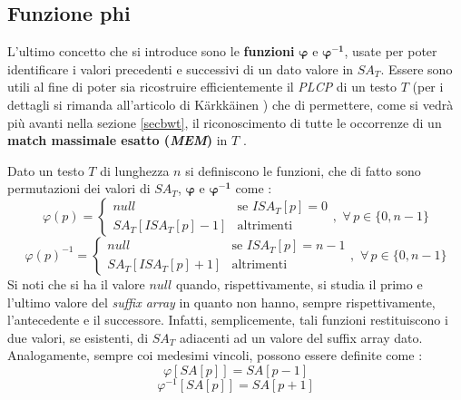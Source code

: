 \subsection{Funzione phi}
L'ultimo concetto che si introduce sono le \textbf{funzioni}
$\boldsymbol\varphi$ e $\mathbf{\boldsymbol\varphi^{-1}}$, usate per poter
identificare i valori precedenti e successivi di 
un dato valore in $SA_T$. Essere sono utili al fine di poter sia ricostruire
efficientemente il \textit{PLCP} di un testo $T$ (per i dettagli si rimanda
all'articolo di K\"{a}rkk\"{a}inen \cite{plcp}) che di permettere, come si vedrà
più  avanti nella sezione \ref{secbwt}, il riconoscimento di tutte le occorrenze
di un \textbf{match massimale esatto (\textit{MEM})} in $T$ \cite{phoni}.
\begin{definizione}
  Dato un testo $T$ di lunghezza $n$ si definiscono le funzioni, che di fatto
  sono permutazioni dei valori di $SA_T$, $\boldsymbol\varphi$ e
  $\mathbf{\boldsymbol\varphi^{-1}}$ come \cite{phoni}: 
  \begin{equation}
    \label{eq:phidef1}
    \varphi(p)=
    \begin{cases}
      null&\mbox{se } ISA_T[p]=0\\
      SA_T[ISA_T[p]-1]&\mbox{altrimenti}
    \end{cases},\,\,\forall\, p\in\{0,n-1\}
  \end{equation}
  \begin{equation}
    \label{eq:phiinvdef1}
    \varphi(p)^{-1}=
    \begin{cases}
      null&\mbox{se } ISA_T[p]=n-1\\
      SA_T[ISA_T[p]+1]&\mbox{altrimenti}
    \end{cases},\,\,\forall\, p\in\{0,n-1\}
  \end{equation}
  Si noti che si ha il valore $null$ quando, rispettivamente, si studia il
  primo e l'ultimo valore del \textit{suffix array} in quanto non hanno, sempre
  rispettivamente, l'antecedente e il successore.   Infatti, semplicemente, tali
  funzioni restituiscono i due valori, se 
  esistenti, di $SA_T$ adiacenti ad un valore del suffix array dato.\\
  Analogamente, sempre coi medesimi vincoli, possono essere definite come
  \cite{plcp}: 
  \begin{equation}
    \label{eq:phidef2}
    \varphi[SA[p]]=SA[p-1]
  \end{equation}
  \begin{equation}
    \label{eq:phiinvdef2}
    \varphi^{-1}[SA[p]]=SA[p+1]
  \end{equation}

\end{definizione}
